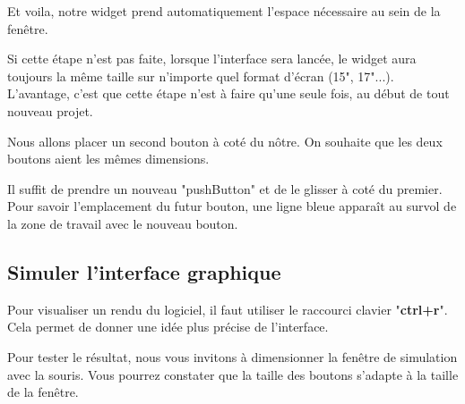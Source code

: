 Et voila, notre widget prend automatiquement l'espace nécessaire au sein de la fenêtre. \newline





Si cette étape n'est pas faite, lorsque l'interface sera lancée, le widget aura toujours la même taille sur n'importe quel format d'écran (15", 17"...). L'avantage, c'est que cette étape n'est à faire qu'une seule fois, au début de tout nouveau projet. \newline

Nous allons placer un second bouton à coté du nôtre. On souhaite que les deux boutons aient les mêmes dimensions.

Il suffit de prendre un nouveau "pushButton" et de le glisser à coté du premier. Pour savoir l'emplacement du futur bouton, une ligne bleue apparaît au survol de la zone de travail avec le nouveau bouton.




{\color{red}}

\subsection{Simuler l'interface graphique}

Pour visualiser un rendu du logiciel, il faut utiliser le raccourci clavier "\textbf{ctrl+r}". \newline Cela permet de donner une idée plus précise de l'interface.




Pour tester le résultat, nous vous invitons à dimensionner la fenêtre de simulation avec la souris. Vous pourrez constater que la taille des boutons s'adapte à la taille de la fenêtre.

